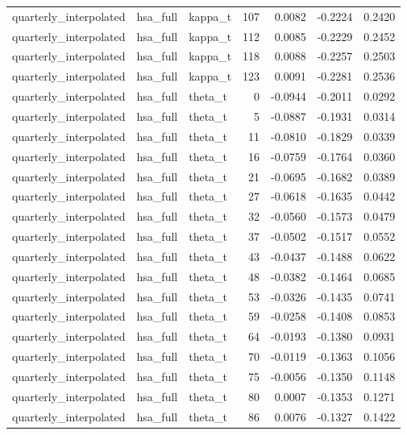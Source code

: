\begin{tabular}{lllrrrr}
quarterly\_interpolated & hsa\_full & kappa\_t & 107 & 0.0082 & -0.2224 & 0.2420 \\
quarterly\_interpolated & hsa\_full & kappa\_t & 112 & 0.0085 & -0.2229 & 0.2452 \\
quarterly\_interpolated & hsa\_full & kappa\_t & 118 & 0.0088 & -0.2257 & 0.2503 \\
quarterly\_interpolated & hsa\_full & kappa\_t & 123 & 0.0091 & -0.2281 & 0.2536 \\
quarterly\_interpolated & hsa\_full & theta\_t & 0 & -0.0944 & -0.2011 & 0.0292 \\
quarterly\_interpolated & hsa\_full & theta\_t & 5 & -0.0887 & -0.1931 & 0.0314 \\
quarterly\_interpolated & hsa\_full & theta\_t & 11 & -0.0810 & -0.1829 & 0.0339 \\
quarterly\_interpolated & hsa\_full & theta\_t & 16 & -0.0759 & -0.1764 & 0.0360 \\
quarterly\_interpolated & hsa\_full & theta\_t & 21 & -0.0695 & -0.1682 & 0.0389 \\
quarterly\_interpolated & hsa\_full & theta\_t & 27 & -0.0618 & -0.1635 & 0.0442 \\
quarterly\_interpolated & hsa\_full & theta\_t & 32 & -0.0560 & -0.1573 & 0.0479 \\
quarterly\_interpolated & hsa\_full & theta\_t & 37 & -0.0502 & -0.1517 & 0.0552 \\
quarterly\_interpolated & hsa\_full & theta\_t & 43 & -0.0437 & -0.1488 & 0.0622 \\
quarterly\_interpolated & hsa\_full & theta\_t & 48 & -0.0382 & -0.1464 & 0.0685 \\
quarterly\_interpolated & hsa\_full & theta\_t & 53 & -0.0326 & -0.1435 & 0.0741 \\
quarterly\_interpolated & hsa\_full & theta\_t & 59 & -0.0258 & -0.1408 & 0.0853 \\
quarterly\_interpolated & hsa\_full & theta\_t & 64 & -0.0193 & -0.1380 & 0.0931 \\
quarterly\_interpolated & hsa\_full & theta\_t & 70 & -0.0119 & -0.1363 & 0.1056 \\
quarterly\_interpolated & hsa\_full & theta\_t & 75 & -0.0056 & -0.1350 & 0.1148 \\
quarterly\_interpolated & hsa\_full & theta\_t & 80 & 0.0007 & -0.1353 & 0.1271 \\
quarterly\_interpolated & hsa\_full & theta\_t & 86 & 0.0076 & -0.1327 & 0.1422 \\

\end{tabular}
